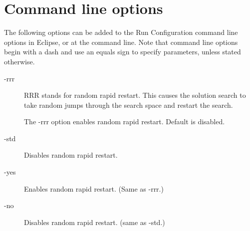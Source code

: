 \documentclass{article}
\begin{document}
\section{Command line options}

The following options can be added to the Run Configuration command line options in Eclipse, or at the command line.  Note that command line options begin with a dash and use an equals sign to specify parameters, unless stated otherwise.

\begin{description}
\item[-rrr] RRR stands for random rapid restart.  This causes the solution search to take random jumps through the search space and restart the search.
 
The -rrr option enables random rapid restart.  Default is disabled.
\item[-std] Disables random rapid restart.
\item[-yes] Enables random rapid restart. (Same as -rrr.)
\item[-no] Disables random rapid restart. (same as -std.)


\end{description}
\end{document}
